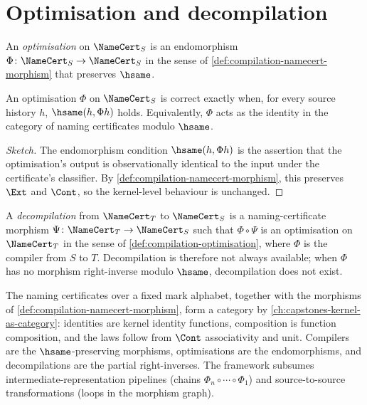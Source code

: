 \section{Optimisation and decompilation}
\label{sec:compilation-optimisation-decompilation}

\begin{definition}[Optimisation]
\label{def:compilation-optimisation}
An \emph{optimisation} on $\NameCert_S$ is an endomorphism $\Phi \colon \NameCert_S \to \NameCert_S$ in the sense of \autoref{def:compilation-namecert-morphism} that preserves $\hsame$.
\end{definition}

\begin{theorem}
\label{thm:compilation-optimisation-correct}
An optimisation $\Phi$ on $\NameCert_S$ is correct exactly when, for every source history $h$, $\hsame(h, \Phi h)$ holds. Equivalently, $\Phi$ acts as the identity in the category of naming certificates modulo $\hsame$.
\end{theorem}

\begin{proof}[Sketch]
The endomorphism condition $\hsame(h, \Phi h)$ is the assertion that the optimisation's output is observationally identical to the input under the certificate's classifier. By \autoref{def:compilation-namecert-morphism}, this preserves $\Ext$ and $\Cont$, so the kernel-level behaviour is unchanged.
\end{proof}

\begin{definition}[Decompilation]
\label{def:compilation-decompilation}
A \emph{decompilation} from $\NameCert_T$ to $\NameCert_S$ is a naming-certificate morphism $\Psi \colon \NameCert_T \to \NameCert_S$ such that $\Phi \circ \Psi$ is an optimisation on $\NameCert_T$ in the sense of \autoref{def:compilation-optimisation}, where $\Phi$ is the compiler from $S$ to $T$. Decompilation is therefore not always available; when $\Phi$ has no morphism right-inverse modulo $\hsame$, decompilation does not exist.
\end{definition}

\begin{remark}
\label{rem:compilation-category}
The naming certificates over a fixed mark alphabet, together with the morphisms of \autoref{def:compilation-namecert-morphism}, form a category by \autoref{ch:capstones-kernel-as-category}: identities are kernel identity functions, composition is function composition, and the laws follow from $\Cont$ associativity and unit. Compilers are the $\hsame$-preserving morphisms, optimisations are the endomorphisms, and decompilations are the partial right-inverses. The framework subsumes intermediate-representation pipelines (chains $\Phi_n \circ \cdots \circ \Phi_1$) and source-to-source transformations (loops in the morphism graph).
\end{remark}
